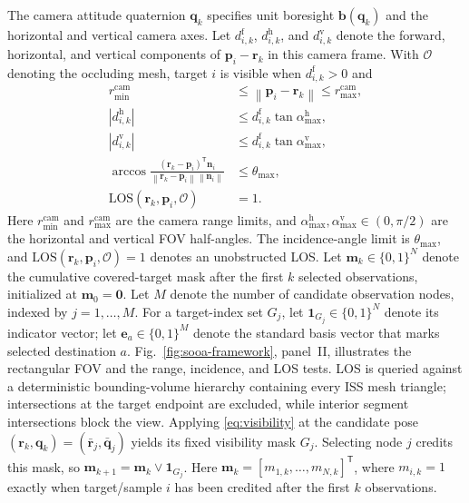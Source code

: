 \documentclass{IEEEtaes}
\newcommand{\norm}[1]{\left\lVert #1 \right\rVert}
\newcommand{\los}{\mathrm{LOS}}
\begin{document}
The camera attitude quaternion $\mathbf q_k$ specifies unit boresight $\mathbf b(\mathbf q_k)$ and the horizontal and vertical camera axes. Let $d_{i,k}^{\mathrm f}$, $d_{i,k}^{\mathrm h}$, and $d_{i,k}^{\mathrm v}$ denote the forward, horizontal, and vertical components of $\mathbf p_i-\mathbf r_k$ in this camera frame. With $\mathcal O$ denoting the occluding mesh, target $i$ is visible when $d_{i,k}^{\mathrm f}>0$ and
\begin{align}
  r_{\min}^{\mathrm{cam}}&\le\norm{\mathbf p_i-\mathbf r_k}\le r_{\max}^{\mathrm{cam}},\nonumber\\
  |d_{i,k}^{\mathrm h}|&\le d_{i,k}^{\mathrm f}\tan\alpha_{\max}^{\mathrm h},\nonumber\\
  |d_{i,k}^{\mathrm v}|&\le d_{i,k}^{\mathrm f}\tan\alpha_{\max}^{\mathrm v},\nonumber\\
  \arccos\!\frac{(\mathbf r_k-\mathbf p_i)^{\mathsf T}\mathbf n_i}
  {\norm{\mathbf r_k-\mathbf p_i}\norm{\mathbf n_i}}&\le\theta_{\max},\nonumber\\
  \los(\mathbf r_k,\mathbf p_i,\mathcal O)&=1.
  \label{eq:visibility}
\end{align}
Here $r_{\min}^{\mathrm{cam}}$ and $r_{\max}^{\mathrm{cam}}$ are the camera range limits, and $\alpha_{\max}^{\mathrm h},\alpha_{\max}^{\mathrm v}\in(0,\pi/2)$ are the horizontal and vertical FOV half-angles. The incidence-angle limit is $\theta_{\max}$, and $\los(\mathbf r_k,\mathbf p_i,\mathcal O)=1$ denotes an unobstructed LOS. Let $\mathbf m_k\in\{0,1\}^{N}$ denote the cumulative covered-target mask after the first $k$ selected observations, initialized at $\mathbf m_0=\mathbf 0$. Let $M$ denote the number of candidate observation nodes, indexed by $j=1,\ldots,M$. For a target-index set $G_j$, let $\mathbf 1_{G_j}\in\{0,1\}^{N}$ denote its indicator vector; let $\mathbf e_a\in\{0,1\}^{M}$ denote the standard basis vector that marks selected destination $a$. Fig.~\ref{fig:sooa-framework}, panel~II, illustrates the rectangular FOV and the range, incidence, and LOS tests. LOS is queried against a deterministic bounding-volume hierarchy containing every ISS mesh triangle; intersections at the target endpoint are excluded, while interior segment intersections block the view. Applying \eqref{eq:visibility} at the candidate pose $(\mathbf r_k,\mathbf q_k)=(\bar{\mathbf r}_j,\bar{\mathbf q}_j)$ yields its fixed visibility mask $G_j$. Selecting node $j$ credits this mask, so $\mathbf m_{k+1}=\mathbf m_k\lor\mathbf 1_{G_j}$. Here $\mathbf m_k=[m_{1,k},\ldots,m_{N,k}]^{\mathsf T}$, where $m_{i,k}=1$ exactly when target/sample $i$ has been credited after the first $k$ observations.
\end{document}
